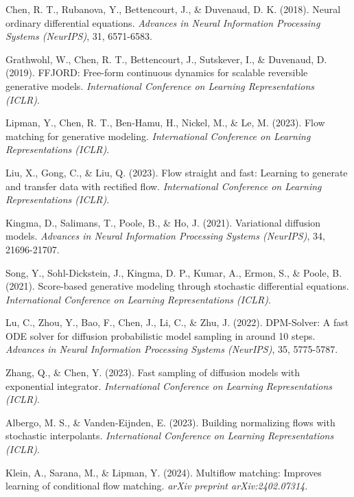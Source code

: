 \documentclass[11pt,a4paper]{article}
\begin{document}
\begin{thebibliography}{99}
Chen, R. T., Rubanova, Y., Bettencourt, J., \& Duvenaud, D. K. (2018).
Neural ordinary differential equations.
\textit{Advances in Neural Information Processing Systems (NeurIPS)}, 31, 6571-6583.

Grathwohl, W., Chen, R. T., Bettencourt, J., Sutskever, I., \& Duvenaud, D. (2019).
FFJORD: Free-form continuous dynamics for scalable reversible generative models.
\textit{International Conference on Learning Representations (ICLR)}.

Lipman, Y., Chen, R. T., Ben-Hamu, H., Nickel, M., \& Le, M. (2023).
Flow matching for generative modeling.
\textit{International Conference on Learning Representations (ICLR)}.

Liu, X., Gong, C., \& Liu, Q. (2023).
Flow straight and fast: Learning to generate and transfer data with rectified flow.
\textit{International Conference on Learning Representations (ICLR)}.

Kingma, D., Salimans, T., Poole, B., \& Ho, J. (2021).
Variational diffusion models.
\textit{Advances in Neural Information Processing Systems (NeurIPS)}, 34, 21696-21707.

Song, Y., Sohl-Dickstein, J., Kingma, D. P., Kumar, A., Ermon, S., \& Poole, B. (2021).
Score-based generative modeling through stochastic differential equations.
\textit{International Conference on Learning Representations (ICLR)}.

Lu, C., Zhou, Y., Bao, F., Chen, J., Li, C., \& Zhu, J. (2022).
DPM-Solver: A fast ODE solver for diffusion probabilistic model sampling in around 10 steps.
\textit{Advances in Neural Information Processing Systems (NeurIPS)}, 35, 5775-5787.

Zhang, Q., \& Chen, Y. (2023).
Fast sampling of diffusion models with exponential integrator.
\textit{International Conference on Learning Representations (ICLR)}.

Albergo, M. S., \& Vanden-Eijnden, E. (2023).
Building normalizing flows with stochastic interpolants.
\textit{International Conference on Learning Representations (ICLR)}.

Klein, A., Sarana, M., \& Lipman, Y. (2024).
Multiflow matching: Improves learning of conditional flow matching.
\textit{arXiv preprint arXiv:2402.07314}.


\end{thebibliography}
\end{document}
